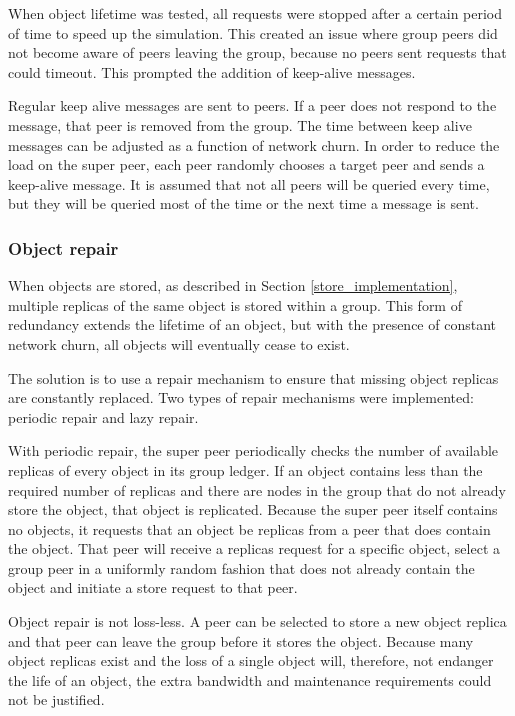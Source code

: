 When object lifetime was tested, all requests were stopped after a certain period of time to speed up the simulation. This created an issue where group peers did not become aware of peers leaving the group, because no peers sent requests that could timeout. This prompted the addition of keep-alive messages.

Regular keep alive messages are sent to peers. If a peer does not respond to the message, that peer is removed from the group. The time between keep alive messages can be adjusted as a function of network churn. In order to reduce the load on the super peer, each peer randomly chooses a target peer and sends a keep-alive message. It is assumed that not all peers will be queried every time, but they will be queried most of the time or the next time a message is sent.

    \subsubsection{Object repair}
    \label{object_repair_implementation}

When objects are stored, as described in Section \ref{store_implementation}, multiple replicas of the same object is stored within a group. This form of redundancy extends the lifetime of an object, but with the presence of constant network churn, all objects will eventually cease to exist.

The solution is to use a repair mechanism to ensure that missing object replicas are constantly replaced. Two types of repair mechanisms were implemented: periodic repair and lazy repair.

With periodic repair, the super peer periodically checks the number of available replicas of every object in its group ledger. If an object contains less than the required number of replicas and there are nodes in the group that do not already store the object, that object is replicated. Because the super peer itself contains no objects, it requests that an object be replicas from a peer that does contain the object. That peer will receive a replicas request for a specific object, select a group peer in a uniformly random fashion that does not already contain the object and initiate a store request to that peer.

Object repair is not loss-less. A peer can be selected to store a new object replica and that peer can leave the group before it stores the object. Because many object replicas exist and the loss of a single object will, therefore, not endanger the life of an object, the extra bandwidth and maintenance requirements could not be justified.

